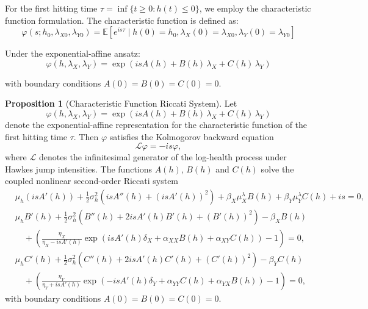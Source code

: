 \documentclass{article}
\theoremstyle{definition}
\newtheorem{proposition}{Proposition}[section]
\begin{document}
For the first hitting time $\tau = \inf\{t \geq 0 : h(t) \leq 0\}$, we employ the characteristic function formulation. The characteristic function is defined as:
\begin{equation}
\varphi(s; h_0, \lambda_{X0}, \lambda_{Y0}) = \mathbb{E}[e^{is\tau} \mid h(0) = h_0, \lambda_X(0) = \lambda_{X0}, \lambda_Y(0) = \lambda_{Y0}]
\end{equation}

Under the exponential-affine ansatz:
\begin{equation}
\varphi(h, \lambda_X, \lambda_Y) = \exp\!\left( i s A(h) + B(h)\,\lambda_X + C(h)\,\lambda_Y \right) \label{eq:cf_ansatz}
\end{equation}

with boundary conditions $A(0) = B(0) = C(0) = 0$.

\begin{proposition}[Characteristic Function Riccati System]
\label{prop:cf_riccati}
Let 
\[
\varphi(h, \lambda_X, \lambda_Y) 
= \exp\!\left( i s A(h) + B(h)\,\lambda_X + C(h)\,\lambda_Y \right)
\]
denote the exponential-affine representation for the characteristic function of the first hitting time $\tau$. Then $\varphi$ satisfies the Kolmogorov backward equation
\[
\mathcal{L}\varphi = -is \varphi,
\]
where $\mathcal{L}$ denotes the infinitesimal generator of the log-health process under Hawkes jump intensities. The functions $A(h)$, $B(h)$ and $C(h)$ solve the coupled nonlinear second-order Riccati system
\[
\begin{aligned}
& \mu_h (is A'(h)) 
+ \frac{1}{2}\sigma_h^2 \left( is A''(h) + (is A'(h))^2 \right)
+ \beta_X \mu_X^\lambda B(h) 
+ \beta_Y \mu_Y^\lambda C(h) 
+ is = 0, \\[1.2ex]
& \mu_h B'(h) 
+ \frac{1}{2}\sigma_h^2 \left( B''(h) + 2 is A'(h) B'(h) + (B'(h))^2 \right)
- \beta_X B(h) \\
&\quad + \left( \frac{\eta_X}{\eta_X - is A'(h)} 
\exp\!\left( is A'(h)\delta_X + \alpha_{XX} B(h) + \alpha_{XY} C(h) \right) - 1 \right) 
= 0, \\[1.2ex]
& \mu_h C'(h) 
+ \frac{1}{2}\sigma_h^2 \left( C''(h) + 2 is A'(h) C'(h) + (C'(h))^2 \right)
- \beta_Y C(h) \\
&\quad + \left( \frac{\eta_Y}{\eta_Y + is A'(h)} 
\exp\!\left( -is A'(h)\delta_Y + \alpha_{YY} C(h) + \alpha_{YX} B(h) \right) - 1 \right) 
= 0,
\end{aligned}
\]
with boundary conditions $A(0) = B(0) = C(0) = 0$.
\end{proposition}
\end{document}
